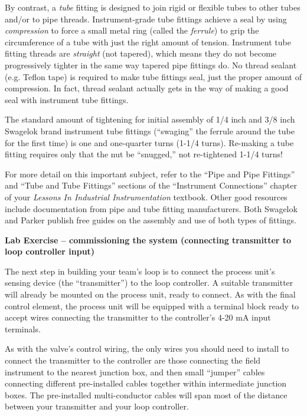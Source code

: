 \vskip 10pt

By contrast, a {\it tube} fitting is designed to join rigid or flexible tubes to other tubes and/or to pipe threads.  Instrument-grade tube fittings achieve a seal by using {\it compression} to force a small metal ring (called the {\it ferrule}) to grip the circumference of a tube with just the right amount of tension.  Instrument tube fitting threads are {\it straight} (not tapered), which means they do not become progressively tighter in the same way tapered pipe fittings do.  No thread sealant (e.g. Teflon tape) is required to make tube fittings seal, just the proper amount of compression.  In fact, thread sealant actually gets in the way of making a good seal with instrument tube fittings.  

The standard amount of tightening for initial assembly of 1/4 inch and 3/8 inch Swagelok brand instrument tube fittings (``swaging'' the ferrule around the tube for the first time) is one and one-quarter turns (1-1/4 turns).  Re-making a tube fitting requires only that the nut be ``snugged,'' not re-tightened 1-1/4 turns!

\vskip 10pt

For more detail on this important subject, refer to the ``Pipe and Pipe Fittings'' and ``Tube and Tube Fittings'' sections of the ``Instrument Connections'' chapter of your {\it Lessons In Industrial Instrumentation} textbook.  Other good resources include documentation from pipe and tube fitting manufacturers.  Both Swagelok and Parker publish free guides on the assembly and use of both types of fittings.










\vfil \eject

\noindent
{\bf Lab Exercise -- commissioning the system (connecting transmitter to loop controller input)}

\vskip 5pt

The next step in building your team's loop is to connect the process unit's sensing device (the ``transmitter'') to the loop controller.  A suitable transmitter will already be mounted on the process unit, ready to connect.  As with the final control element, the process unit will be equipped with a terminal block ready to accept wires connecting the transmitter to the controller's 4-20 mA input terminals.

As with the valve's control wiring, the only wires you should need to install to connect the transmitter to the controller are those connecting the field instrument to the nearest junction box, and then small ``jumper'' cables connecting different pre-installed cables together within intermediate junction boxes.  The pre-installed multi-conductor cables will span most of the distance between your transmitter and your loop controller.

